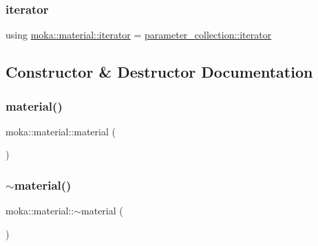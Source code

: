 \mbox{\label{classmoka_1_1material_ac6839c8e1a338dbaef539569388f89e5}} 
\subsubsection{\texorpdfstring{iterator}{iterator}}
{\footnotesize\ttfamily using \mbox{\hyperlink{classmoka_1_1material_ac6839c8e1a338dbaef539569388f89e5}{moka\+::material\+::iterator}} =  \mbox{\hyperlink{classmoka_1_1parameter__collection_a2ec8bed3c1d7de9e5c2199ede27aa919}{parameter\+\_\+collection\+::iterator}}}



\subsection{Constructor \& Destructor Documentation}
\mbox{\label{classmoka_1_1material_a851d0531a3bd13fe9594bad9c460eb73}} 
\subsubsection{\texorpdfstring{material()}{material()}\hspace{0.1cm}{\footnotesize\ttfamily [1/5]}}
{\footnotesize\ttfamily moka\+::material\+::material (\begin{DoxyParamCaption}{ }\end{DoxyParamCaption})}

\mbox{\label{classmoka_1_1material_a50747c3e67abffb9c85d1ea2490e42b5}} 
\subsubsection{\texorpdfstring{$\sim$material()}{~material()}}
{\footnotesize\ttfamily moka\+::material\+::$\sim$material (\begin{DoxyParamCaption}{ }\end{DoxyParamCaption})}

\mbox{\label{classmoka_1_1material_a68636cba205cc90086863630778dd56c}} 
